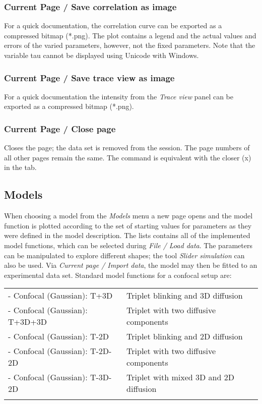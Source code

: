 \subsubsection{Current Page / Save correlation as image}
\label{sec:cp.sc}
For a quick documentation, the correlation curve can be exported as a compressed bitmap (*.png). The plot contains a legend and the actual values and errors of the varied parameters, however, not the fixed parameters. Note that the variable tau cannot be displayed using Unicode with Windows.

\subsubsection{Current Page / Save trace view as image}
\label{sec:cp.st}
For a quick documentation the intensity from the \textit{Trace view} panel can be exported as a compressed bitmap (*.png). 

\subsubsection{Current Page / Close page}
\label{sec:cp.cp}
Closes the page; the data set is removed from the session. The page numbers of all other pages remain the same. The command is equivalent with the closer (x) in the tab. 

\subsection{Models}
\label{sec:models}
When choosing a model from the \textit{Models} menu a new page opens and the model function is plotted according to the set of starting values for parameters as they were defined in the model description. The lists contains all of the implemented model functions, which can be selected during \textit{File / Load data}. The parameters can be manipulated to explore different shapes; the tool \textit{Slider simulation} can also be used. Via \textit{Current page / Import data}, the model may then be fitted to an experimental data set. 
Standard model functions for a confocal setup are:

\begin{tabular}{l l}
\rule{0pt}{3ex} - Confocal (Gaussian): T+3D & Triplet blinking and 3D diffusion \\
\rule{0pt}{3ex} - Confocal (Gaussian): T+3D+3D & Triplet with two diffusive components \\
\rule{0pt}{3ex} - Confocal (Gaussian): T-2D &  Triplet blinking and 2D diffusion \\
\rule{0pt}{3ex} - Confocal (Gaussian): T-2D-2D & Triplet with two diffusive components \\
\rule{0pt}{3ex} - Confocal (Gaussian): T-3D-2D &  Triplet with mixed 3D and 2D diffusion \\
\rule{0pt}{3ex}
\end{tabular}

